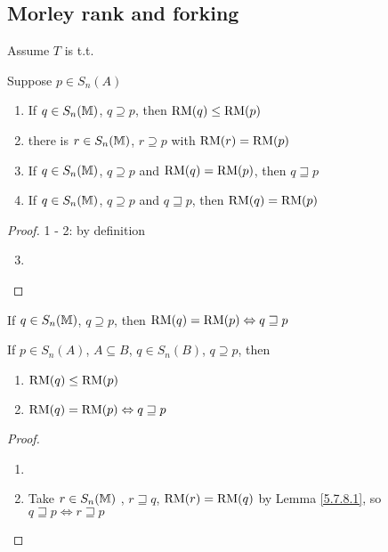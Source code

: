 \documentclass[11pt]{article}
\begin{document}
\subsection{Morley rank and forking}
\label{sec:org76f8a88}
Assume \(T\) is t.t.

\begin{lemma}[]
Suppose \(p\in S_n(A)\)
\begin{enumerate}
\item If \(q\in S_n(\mathbb{M})\), \(q\supseteq p\), then \(\operatorname{RM}(q)\le\operatorname{RM}(p)\)
\item there is \(r\in S_n(\mathbb{M})\), \(r\supseteq p\) with \(\operatorname{RM}(r)=\operatorname{RM}(p)\)
\item If \(q\in S_n(\mathbb{M})\), \(q\supseteq p\) and \(\operatorname{RM}(q)=\operatorname{RM}(p)\), then \(q\sqsupseteq p\)
\item If \(q\in S_n(\mathbb{M})\), \(q\supseteq p\) and \(q\sqsupseteq p\), then \(\operatorname{RM}(q)=\operatorname{RM}(p)\)
\end{enumerate}
\end{lemma}

\begin{proof}
1 - 2: by definition

\begin{enumerate}
\setcounter{enumi}{2}
\item 
\end{enumerate}
\end{proof}

If \(q\in S_n(\mathbb{M})\), \(q\supseteq p\), then \(\operatorname{RM}(q)=\operatorname{RM}(p)\Leftrightarrow q\sqsupseteq p\)

\begin{proposition}[]
If \(p\in S_n(A)\), \(A\subseteq B\), \(q\in S_n(B)\), \(q\supseteq p\), then
\begin{enumerate}
\item \(\operatorname{RM}(q)\le\operatorname{RM}(p)\)
\item \(\operatorname{RM}(q)=\operatorname{RM}(p)\Leftrightarrow q\sqsupseteq p\)
\end{enumerate}
\end{proposition}

\begin{proof}
\begin{enumerate}
\item 

\item Take \(r\in S_n(\mathbb{M})\) , \(r\sqsupseteq q\), \(\operatorname{RM}(r)=\operatorname{RM}(q)\) by Lemma \ref{5.7.8.1},
so \(q\sqsupseteq p\Leftrightarrow r\sqsupseteq p\)
\end{enumerate}
\end{proof}
\end{document}
